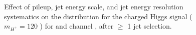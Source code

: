 \begin{figure}
    \caption{ Effect of pileup, jet energy scale, and jet energy resolution systematics on the \mjj 
	distribution for the charged Higgs signal ($m_{H^+} = 120$ \GeV) for \mujets and \ejets channel
	, after $\geq$ 1 \PQc jet selection.}
    \label{fig:sys_effect_wh1}
\end{figure}

